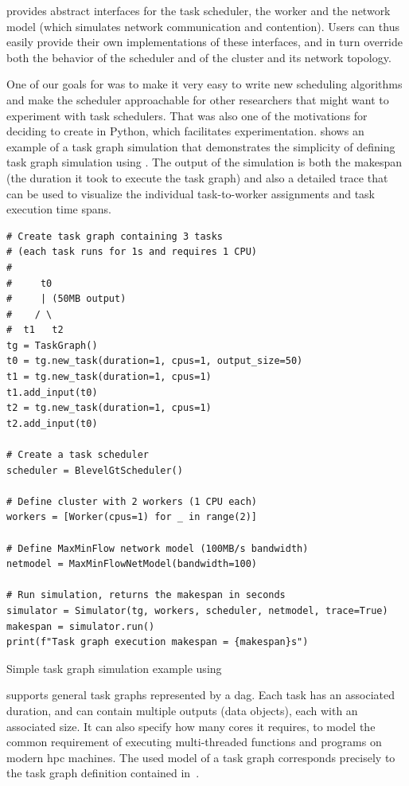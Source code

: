 \estee{} provides abstract interfaces for the task scheduler, the worker and the
network model (which simulates network communication and contention). Users can thus easily provide
their own implementations of these interfaces, and in turn override both the behavior of the
scheduler and of the cluster and its network topology.

One of our goals for \estee{} was to make it very easy to write new scheduling
algorithms and make the scheduler approachable for other researchers that might want to experiment
with task schedulers. That was also one of the motivations for deciding to create
\estee{} in Python, which facilitates experimentation.  shows
an example of a task graph simulation that demonstrates the simplicity of defining task graph
simulation using \estee{}. The output of the simulation is both the makespan (the
duration it took to execute the task graph) and also a detailed trace that can be used to visualize
the individual task-to-worker assignments and task execution time spans.

\begin{listing}
	\begin{verbatim}
# Create task graph containing 3 tasks
# (each task runs for 1s and requires 1 CPU)
#
#     t0
#     | (50MB output)
#    / \
#  t1   t2
tg = TaskGraph()
t0 = tg.new_task(duration=1, cpus=1, output_size=50)
t1 = tg.new_task(duration=1, cpus=1)
t1.add_input(t0)
t2 = tg.new_task(duration=1, cpus=1)
t2.add_input(t0)

# Create a task scheduler
scheduler = BlevelGtScheduler()

# Define cluster with 2 workers (1 CPU each)
workers = [Worker(cpus=1) for _ in range(2)]

# Define MaxMinFlow network model (100MB/s bandwidth)
netmodel = MaxMinFlowNetModel(bandwidth=100)

# Run simulation, returns the makespan in seconds
simulator = Simulator(tg, workers, scheduler, netmodel, trace=True)
makespan = simulator.run()
print(f"Task graph execution makespan = {makespan}s")
    \end{verbatim}
	\caption{Simple task graph simulation example using \estee{}}
	\label{lst:estee-example}
\end{listing}

\estee{} supports general task graphs represented by a \gls{dag}.
Each task has an associated duration, and can contain multiple outputs (data objects), each with an
associated size. It can also specify how many cores it requires, to model the common requirement of
executing multi-threaded functions and programs on modern \gls{hpc} machines. The
used model of a task graph corresponds precisely to the task graph definition contained
in~\Autoref{ch:taskgraphs}.

